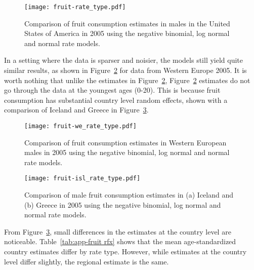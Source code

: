     \begin{figure}[h]
        \begin{center}
            \texttt{[image: fruit-rate\_type.pdf]}
            \caption{Comparison of fruit consumption estimates in
              males in the United States of America in 2005 using the
              negative binomial, log normal and normal rate models.}
            \label{fig:app-fruit rate type}
        \end{center}
    \end{figure}

In a setting where the data is sparser and noisier, the
models still yield quite similar results, as shown in Figure~\ref{fig:app-fruit europe}
for data from Western Europe 2005.  It is worth nothing that unlike
the estimates in Figure~\ref{fig:app-fruit europe},
Figure~\ref{fig:app-fruit europe} estimates do not go through the
data at the youngest ages (0-20).  This is because fruit consumption has
substantial country level random effects, shown with a comparison of
Iceland and Greece in Figure~\ref{fig:app-fruit countries}.

    \begin{figure}[h]
        \begin{center}
            \texttt{[image: fruit-we\_rate\_type.pdf]}
            \caption{Comparison of fruit consumption estimates in
              Western European males in 2005 using the
              negative binomial, log normal and normal rate models.}
            \label{fig:app-fruit europe}
        \end{center}
    \end{figure}

    \begin{figure}[h]
        \begin{center}
            \texttt{[image: fruit-isl\_rate\_type.pdf]}
            \caption{Comparison of male fruit consumption estimates in
              (a) Iceland and (b) Greece in 2005 using the
              negative binomial, log normal and normal rate models.}
            \label{fig:app-fruit countries}
        \end{center}
    \end{figure}

From Figure~\ref{fig:app-fruit countries},
small differences in the estimates at the country level are noticeable.
Table~\ref{tab:app-fruit rfx} shows that the mean age-standardized
country estimates differ by rate type.  However, while estimates at
the country level differ slightly, the regional estimate is the same.

